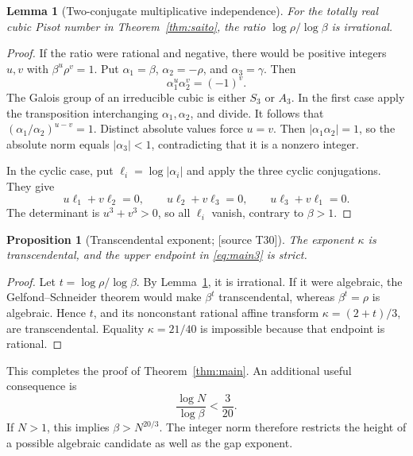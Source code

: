 \documentclass[11pt,a4paper]{article}
\newtheorem{lemma}[theorem]{Lemma}
\newtheorem{proposition}[theorem]{Proposition}
\theoremstyle{definition}\newtheorem{definition}[theorem]{Definition}
\theoremstyle{remark}\newtheorem{remark}[theorem]{Remark}
\newcommand{\sourceT}[1]{\textup{[source T#1]}}
\begin{document}
\begin{lemma}[Two-conjugate multiplicative independence]\label{lem:independence}
For the totally real cubic Pisot number in Theorem~\ref{thm:saito}, the ratio $\log\rho/\log\beta$ is irrational.
\end{lemma}
\begin{proof}
If the ratio were rational and negative, there would be positive integers $u,v$ with $\beta^u\rho^v=1$. Put $\alpha_1=\beta$, $\alpha_2=-\rho$, and $\alpha_3=\gamma$. Then
\[
 \alpha_1^u\alpha_2^v=(-1)^v.
\]
The Galois group of an irreducible cubic is either $S_3$ or $A_3$. In the first case apply the transposition interchanging $\alpha_1,\alpha_2$, and divide. It follows that $(\alpha_1/\alpha_2)^{u-v}=1$. Distinct absolute values force $u=v$. Then $|\alpha_1\alpha_2|=1$, so the absolute norm equals $|\alpha_3|<1$, contradicting that it is a nonzero integer.

In the cyclic case, put $\ell_i=\log|\alpha_i|$ and apply the three cyclic conjugations. They give
\[
 u\ell_1+v\ell_2=0,\qquad u\ell_2+v\ell_3=0,\qquad
 u\ell_3+v\ell_1=0.
\]
The determinant is $u^3+v^3>0$, so all $\ell_i$ vanish, contrary to $\beta>1$.
\end{proof}
\begin{proposition}[Transcendental exponent; \sourceT{30}]\label{prop:kappa}
The exponent $\kappa$ is transcendental, and the upper endpoint in \eqref{eq:main3} is strict.
\end{proposition}
\begin{proof}
Let $t=\log\rho/\log\beta$. By Lemma~\ref{lem:independence}, it is irrational. If it were algebraic, the Gelfond--Schneider theorem \cite{schneider} would make $\beta^t$ transcendental, whereas $\beta^t=\rho$ is algebraic. Hence $t$, and its nonconstant rational affine transform $\kappa=(2+t)/3$, are transcendental. Equality $\kappa=21/40$ is impossible because that endpoint is rational.
\end{proof}
This completes the proof of Theorem~\ref{thm:main}. An additional useful consequence is
\begin{equation}\label{eq:norm-bound}
 \frac{\log N}{\log\beta}<\frac3{20}.
\end{equation}
If $N>1$, this implies $\beta>N^{20/3}$. The integer norm therefore restricts the height of a possible algebraic candidate as well as the gap exponent.
\end{document}
